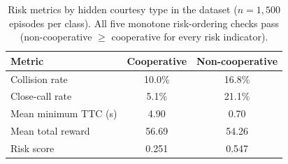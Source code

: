 \begin{table}[htbp]
\centering
\caption{Risk metrics by hidden courtesy type in the dataset
  ($n{=}1{,}500$ episodes per class).
  All five monotone risk-ordering checks pass (non-cooperative $\geq$ cooperative
  for every risk indicator).}
\label{tab:risk_by_courtesy}
\small
\begin{tabular}{lcc}
\toprule
\textbf{Metric} & \textbf{Cooperative} & \textbf{Non-cooperative} \\
\midrule
Collision rate & 10.0\% & 16.8\% \\
Close-call rate & 5.1\% & 21.1\% \\
Mean minimum TTC (s) & 4.90 & 0.70 \\
Mean total reward & 56.69 & 54.26 \\
Risk score & 0.251 & 0.547 \\
\bottomrule
\end{tabular}
\end{table}

